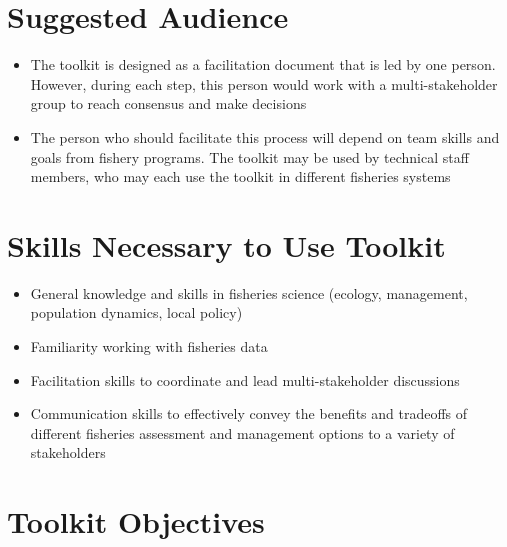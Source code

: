 \documentclass[]{book}
\begin{document}
\section{Suggested Audience}\label{suggested-audience}

\begin{itemize}
\item
  The toolkit is designed as a facilitation document that is led by one
  person. However, during each step, this person would work with a
  multi-stakeholder group to reach consensus and make decisions
\item
  The person who should facilitate this process will depend on team
  skills and goals from fishery programs. The toolkit may be used by
  technical staff members, who may each use the toolkit in different
  fisheries systems
\end{itemize}

\section{Skills Necessary to Use
Toolkit}\label{skills-necessary-to-use-toolkit}

\begin{itemize}
\item
  General knowledge and skills in fisheries science (ecology,
  management, population dynamics, local policy)
\item
  Familiarity working with fisheries data
\item
  Facilitation skills to coordinate and lead multi-stakeholder
  discussions
\item
  Communication skills to effectively convey the benefits and tradeoffs
  of different fisheries assessment and management options to a variety
  of stakeholders
\end{itemize}

\section{Toolkit Objectives}\label{toolkit-objectives}
\end{document}
